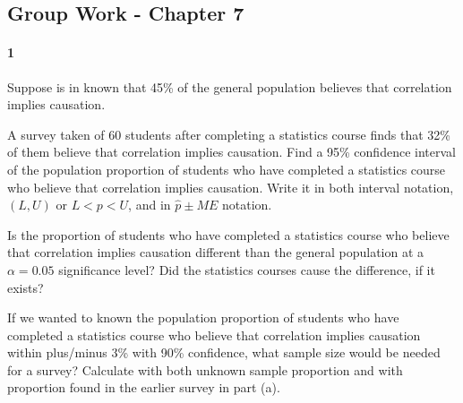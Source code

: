 \documentclass{article}
\begin{document}
\begin{flushleft}
\section*{Group Work - Chapter 7}
\paragraph{1} Suppose is in known that 45\% of the general population believes that correlation implies causation.
\begin{enumalpha}
\item A survey taken of 60 students after completing a statistics course finds that 32\% of them believe that correlation implies causation. Find a 95\% confidence interval of the population proportion of students who have completed a statistics course who believe that correlation implies causation. Write it in both interval notation, $(L, U)$ or $L < p < U$, and in $\hat p \pm ME$ notation.
\vspace{2in}
\item Is the proportion of students who have completed a statistics course who believe that correlation implies causation different than the general population at a $\alpha = 0.05$ significance level? Did the statistics courses cause the difference, if it exists?

\vspace{2.25in}
\item If we wanted to known the population proportion of students who have completed a statistics course who believe that correlation implies causation within plus/minus 3\% with 90\% confidence, what sample size would be needed for a survey? Calculate with both unknown sample proportion and with proportion found in the earlier survey in part (a).
\end{enumalpha}



\newpage

\end{flushleft}
\end{document}
